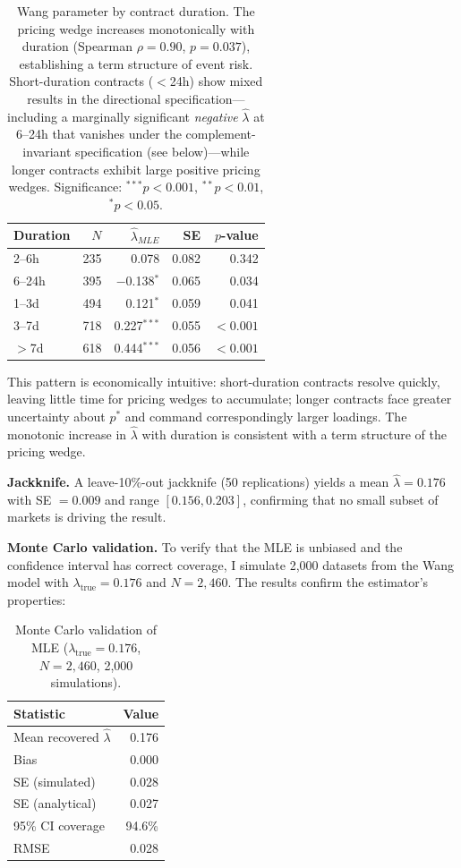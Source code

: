 \documentclass[12pt,a4paper]{article}
\begin{document}
\begin{table}[H]
\centering
\small
\caption{Wang parameter by contract duration. The pricing wedge increases monotonically with duration (Spearman $\rho = 0.90$, $p = 0.037$), establishing a term structure of event risk. Short-duration contracts ($<$24h) show mixed results in the directional specification---including a marginally significant \textit{negative} $\hat{\lambda}$ at 6--24h that vanishes under the complement-invariant specification (see below)---while longer contracts exhibit large positive pricing wedges. Significance: $^{***}p<0.001$, $^{**}p<0.01$, $^{*}p<0.05$.}
\begin{tabular}{lrrrr}
\toprule
Duration & $N$ & $\hat{\lambda}_{MLE}$ & SE & $p$-value \\
\midrule
2--6h & 235 & 0.078 & 0.082 & 0.342 \\
6--24h & 395 & $-$0.138$^{*}$ & 0.065 & 0.034 \\
1--3d & 494 & 0.121$^{*}$ & 0.059 & 0.041 \\
3--7d & 718 & 0.227$^{***}$ & 0.055 & $<0.001$ \\
$>$7d & 618 & 0.444$^{***}$ & 0.056 & $<0.001$ \\
\bottomrule
\end{tabular}
\end{table}

This pattern is economically intuitive: short-duration contracts resolve
quickly, leaving little time for pricing wedges to accumulate; longer
contracts face greater uncertainty about \(p^*\) and command
correspondingly larger loadings. The monotonic increase in
\(\hat{\lambda}\) with duration is consistent with a term structure of
the pricing wedge.

\textbf{Jackknife.} A leave-10\%-out jackknife (50 replications) yields
a mean \(\hat{\lambda} = 0.176\) with SE \(= 0.009\) and range
\([0.156, 0.203]\), confirming that no small subset of markets is
driving the result.

\textbf{Monte Carlo validation.} To verify that the MLE is unbiased and
the confidence interval has correct coverage, I simulate 2,000 datasets
from the Wang model with \(\lambda_{\text{true}} = 0.176\) and
\(N = 2{,}460\). The results confirm the estimator's properties:

\begin{table}[H]
\centering
\small
\caption{Monte Carlo validation of MLE ($\lambda_{\text{true}} = 0.176$, $N = 2{,}460$, 2,000 simulations).}
\begin{tabular}{lr}
\toprule
Statistic & Value \\
\midrule
Mean recovered $\hat{\lambda}$ & 0.176 \\
Bias & 0.000 \\
SE (simulated) & 0.028 \\
SE (analytical) & 0.027 \\
95\% CI coverage & 94.6\% \\
RMSE & 0.028 \\
\bottomrule
\end{tabular}
\end{table}
\end{document}
